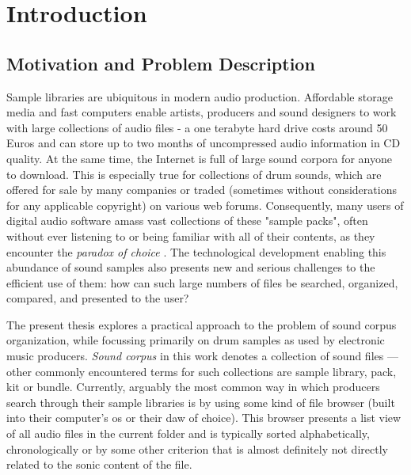 
\section{Introduction}
\label{sec:introduction}

\subsection{Motivation and Problem Description}
\label{subsec:motivation}
Sample libraries are ubiquitous in modern audio production. Affordable storage
media and fast computers enable artists, producers and sound designers to work
with large collections of audio files - a one terabyte hard drive costs around
50 Euros and can store up to two months of uncompressed audio information in CD
quality. At the same time, the Internet is full of large sound corpora for
anyone to download. This is especially true for collections of drum sounds,
which are offered for sale by many companies or traded (sometimes without
considerations for any applicable copyright) on various web forums.
Consequently, many users of digital audio software amass vast collections of
these "sample packs", often without ever listening to or being familiar with
all of their contents, as they encounter the \textit{paradox of choice}
\citep{schwartz2004}. The technological development enabling this abundance of
sound samples also presents new and serious challenges to the efficient use of
them: how can such large numbers of files be searched, organized, compared, and
presented to the user?

\bigskip

The present thesis explores a practical approach to the problem of sound corpus
organization, while focussing primarily on drum samples as used by electronic
music producers. \textit{Sound corpus} in this work denotes a collection of
sound files --- other commonly encountered terms for such collections are sample
library, pack, kit or bundle. Currently, arguably the most common way in which
producers search through their sample libraries is by using some kind of file
browser (built into their computer's \gls{os} or their \gls{daw} of choice).
This browser presents a list view of all audio files in the current folder and
is typically sorted alphabetically, chronologically or by some other criterion
that is almost definitely not directly related to the sonic content of the file.

\smallskip

